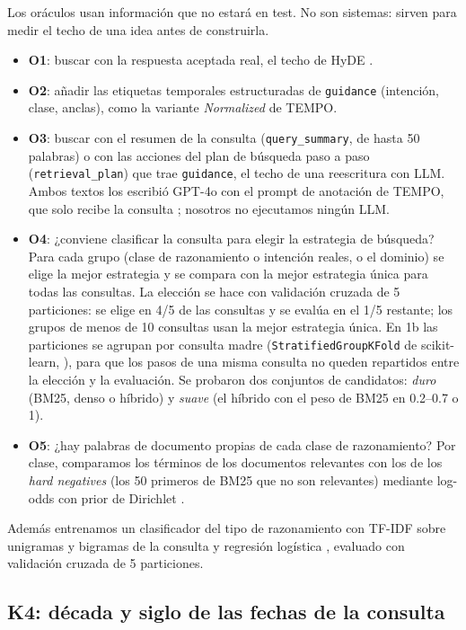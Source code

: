 \documentclass[11pt,a4paper]{article}
\begin{document}
Los oráculos usan información que no estará en test. No son sistemas: sirven para medir el techo de una idea antes de construirla.
\begin{itemize}
  \item \textbf{O1}: buscar con la respuesta aceptada real, el techo de HyDE \citep{gao2023precise}.
  \item \textbf{O2}: añadir las etiquetas temporales estructuradas de \texttt{guidance} (intención, clase, anclas), como la variante \emph{Normalized} de TEMPO.
  \item \textbf{O3}: buscar con el resumen de la consulta (\texttt{query\_summary}, de hasta 50 palabras) o con las acciones del plan de búsqueda paso a paso (\texttt{retrieval\_plan}) que trae \texttt{guidance}, el techo de una reescritura con LLM. Ambos textos los escribió GPT-4o \citep{openai2024gpt4o} con el prompt de anotación de TEMPO, que solo recibe la consulta \citep[apéndice~B.2]{abdallah2026tempo}; nosotros no ejecutamos ningún LLM.
  \item \textbf{O4}: ¿conviene clasificar la consulta para elegir la estrategia de búsqueda? Para cada grupo (clase de razonamiento o intención reales, o el dominio) se elige la mejor estrategia y se compara con la mejor estrategia única para todas las consultas. La elección se hace con validación cruzada de 5 particiones: se elige en 4/5 de las consultas y se evalúa en el 1/5 restante; los grupos de menos de 10 consultas usan la mejor estrategia única. En 1b las particiones se agrupan por consulta madre (\texttt{StratifiedGroupKFold} de scikit-learn, \citealp{pedregosa2011scikit}), para que los pasos de una misma consulta no queden repartidos entre la elección y la evaluación. Se probaron dos conjuntos de candidatos: \emph{duro} (BM25, denso o híbrido) y \emph{suave} (el híbrido con el peso de BM25 en 0.2--0.7 o 1).
  \item \textbf{O5}: ¿hay palabras de documento propias de cada clase de razonamiento? Por clase, comparamos los términos de los documentos relevantes con los de los \emph{hard negatives} (los 50 primeros de BM25 que no son relevantes) mediante log-odds con prior de Dirichlet \citep{monroe2008fightin}.
\end{itemize}
Además entrenamos un clasificador del tipo de razonamiento con TF-IDF sobre unigramas y bigramas de la consulta y regresión logística \citep{pedregosa2011scikit}, evaluado con validación cruzada de 5 particiones.

\subsection{K4: década y siglo de las fechas de la consulta}
\label{sec:k4}
\end{document}
